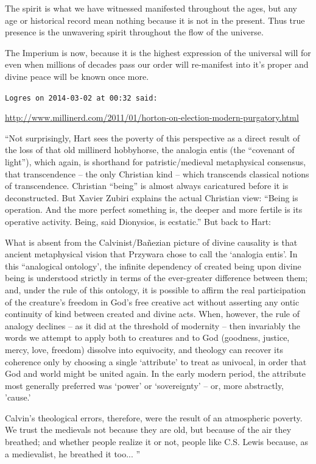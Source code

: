 \begin{footnotesize}
\begin{sffamily}
The spirit is what we have witnessed manifested throughout the ages, but any age or historical record mean nothing because it is not in the present. Thus true presence is the unwavering spirit throughout the flow of the universe.

The Imperium is now, because it is the highest expression of the universal will for even when millions of decades pass our order will re-manifest into it's proper and divine peace will be known once more.

\hfill

\texttt{Logres on 2014-03-02 at 00:32 said:}

\url{http://www.millinerd.com/2011/01/horton-on-election-modern-purgatory.html}

``Not surprisingly, Hart sees the poverty of this perspective as a direct result of the loss of that old millinerd hobbyhorse, the analogia entis (the ``covenant of light''), which again, is shorthand for patristic/medieval metaphysical consensus, that transcendence -- the only Christian kind -- which transcends classical notions of transcendence. Christian ``being'' is almost always caricatured before it is deconstructed. But Xavier Zubiri explains the actual Christian view: ``Being is operation. And the more perfect something is, the deeper and more fertile is its operative activity. Being, said Dionysios, is ecstatic.'' But back to Hart:

What is absent from the Calvinist/Bañezian picture of divine causality is that ancient metaphysical vision that Przywara chose to call the `analogia entis'. In this ``analogical ontology', the infinite dependency of created being upon divine being is understood strictly in terms of the ever-greater difference between them; and, under the rule of this ontology, it is possible to affirm the real participation of the creature's freedom in God's free creative act without asserting any ontic continuity of kind between created and divine acts. When, however, the rule of analogy declines -- as it did at the threshold of modernity -- then invariably the words we attempt to apply both to creatures and to God (goodness, justice, mercy, love, freedom) dissolve into equivocity, and theology can recover its coherence only by choosing a single `attribute' to treat as univocal, in order that God and world might be united again. In the early modern period, the attribute most generally preferred was `power' or `sovereignty' -- or, more abstractly, 'cause.'

Calvin's theological errors, therefore, were the result of an atmospheric poverty. We trust the medievals not because they are old, but because of the air they breathed; and whether people realize it or not, people like C.S. Lewis because, as a medievalist, he breathed it too... ''


\end{sffamily}
\end{footnotesize}
